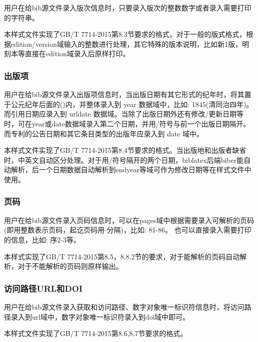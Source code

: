 \begin{property}{}{}
用户在给bib源文件录入版次信息时，只要录入版次的整数数字或者录入需要打印的字符串。

本样式文件实现了GB/T 7714-2015第8.3节要求的格式，对于一般的版式格式，根据edition/version域输入的整数进行处理，其它特殊的版本说明，比如新1版，明刻本等直接在edition域录入后原样打印。
\end{property}

\subsubsection{出版项}\label{sec:fmt:pubitem}

\begin{property}{}{}
用户在给bib源文件录入出版项信息时，当出版日期有其它形式的纪年时，将其置于公元纪年后面的()内，并整体录入到 year 数据域中，比如: 1845(清同治四年)。而引用日期应录入到 urldate 数据域。当除了出版日期外还有修改/更新日期等时，可在year或date数据域录入第二个日期，并用/符号与前一个出版日期隔开。而专利的公告日期和其它条目类型的出版年应录入到 date 域中。

本样式文件实现了GB/T 7714-2015第8.4节要求的格式。当出版地和出版者缺省时，中英文自动区分处理。对于用/符号隔开的两个日期，biblatex后端biber能自动解析，后一个日期数据自动解析到endyear等域可作为修改日期等在样式文件中使用。
\end{property}

\subsubsection{页码}\label{sec:fmt:pages}
\begin{property}{}{}
用户在给bib源文件录入页码信息时，可以在pages域中根据需要录入可解析的页码(即用整数表示页码，起讫页码用-分隔)，比如: 81-86。 也可以直接录入需要打印的信息，比如: 序2-3等。

本样式实现了GB/T 7714-2015第8.5，8.8.2节的要求，对于能解析的页码自动解析，对于不能解析的页码则原样输出。
\end{property}

\subsubsection{访问路径URL和DOI}
\begin{property}{}{}
用户在给bib源文件录入获取和访问路径、数字对象唯一标识符信息时，将访问路径录入到url域中，数字对象唯一标识符录入到doi域中即可。

本样式文件实现了GB/T 7714-2015第8.6,8.7节要求的格式。
\end{property}

